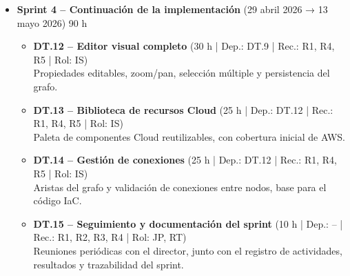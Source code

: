 \documentclass{article}
\begin{document}
{\begin{itemize}[leftmargin=*, itemsep=2pt]
\begin{itemize}[leftmargin=1.2em, itemsep=2pt]
                    \item \textbf{DT.10 – Pruebas de traducción a IaC} 
                    (15 h | Dep.: DT.9 | Rec.: R1, R4, R5 | Rol: IS) \\
                    Primeras pruebas de generación de código HCL \cite{noauthor_hashicorphcl_2026} desde elementos 
                    visuales.
            
                    \item \textbf{DT.11 – Seguimiento y documentación del sprint} 
                    (10 h | Dep.: -- | Rec.: R1, R2, R3, R4 | Rol: JP, RT) \\
                    Reuniones periódicas con el director, junto con el registro de 
                    actividades, resultados y trazabilidad del sprint.
            
                \end{itemize}


            \item \textbf{Sprint 4 – Continuación de la implementación} 
            (29 abril 2026 → 13 mayo 2026) 90 h
            
            \begin{itemize}[leftmargin=1.2em, itemsep=2pt]
            
                \item \textbf{DT.12 – Editor visual completo} 
                (30 h | Dep.: DT.9 | Rec.: R1, R4, R5 | Rol: IS) \\
                Propiedades editables, zoom/pan, selección múltiple y persistencia 
                del grafo.
            
                \item \textbf{DT.13 – Biblioteca de recursos Cloud} 
                (25 h | Dep.: DT.12 | Rec.: R1, R4, R5 | Rol: IS) \\
                Paleta de componentes Cloud reutilizables, con cobertura inicial de AWS.
            
                \item \textbf{DT.14 – Gestión de conexiones} 
                (25 h | Dep.: DT.12 | Rec.: R1, R4, R5 | Rol: IS) \\
                Aristas del grafo y validación de conexiones entre nodos, base para 
                el código IaC.
            
                \item \textbf{DT.15 – Seguimiento y documentación del sprint} 
                (10 h | Dep.: -- | Rec.: R1, R2, R3, R4 | Rol: JP, RT) \\
                Reuniones periódicas con el director, junto con el registro de 
                actividades, resultados y trazabilidad del sprint.
            

\end{itemize}
\end{itemize}}
\end{document}
